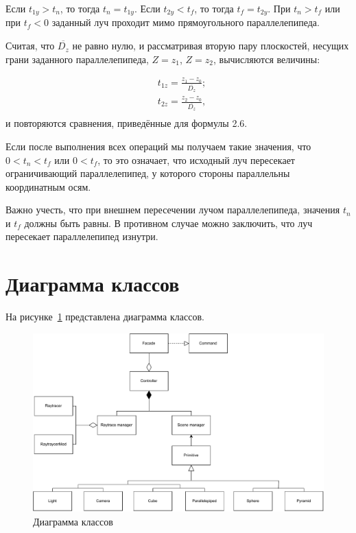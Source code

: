 Если $t_{1y} > t_n$, то тогда $t_n = t_{1y}$.
Если $t_{2y} < t_f$, то тогда $t_f = t_{2y}$.
При $t_n > t_f$ или при $t_f < 0$ заданный луч проходит мимо прямоугольного параллелепипеда.

Считая, что $\overline{D_z}$ не равно нулю, и рассматривая вторую пару плоскостей, несущих грани заданного параллелепипеда, $Z = z_1$, $Z = z_2$, вычисляются величины:

\begin{equation}
	\begin{aligned}
		& t_{1z} = \frac{z_1 - z_0}{\overline{D_z}}; \\ 
		& t_{2z} = \frac{z_2 - z_0}{\overline{D_z}}, \\
	\end{aligned}
\end{equation} 
и повторяются сравнения, приведённые для формулы 2.6.

Если после выполнения всех операций мы получаем такие значения, что $0 < t_n < t_f$ или $ 0 < t_f$, то это означает, что исходный луч пересекает ограничивающий параллелепипед, у которого стороны параллельны координатным осям.

Важно учесть, что при внешнем пересечении лучом параллелепипеда, значения $t_n$ и $t_f$ должны быть равны. В противном случае можно заключить, что луч пересекает параллелепипед изнутри.
\clearpage

\section{Диаграмма классов}

На рисунке~\ref{fig:diagramm} представлена диаграмма классов.
\FloatBarrier
\begin{figure}[h]
	\begin{center}
		\includegraphics[width=\linewidth]{photos/diagram.pdf}
	\end{center}
	\caption{Диаграмма классов}
	\label{fig:diagramm}
\end{figure}
\FloatBarrier

